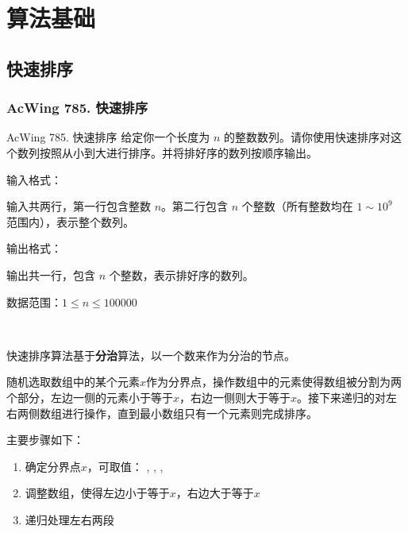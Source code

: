 \chapter{算法基础}


\section{快速排序}

\subsection{AcWing 785. 快速排序}

\begin{titledbox}{AcWing 785. 快速排序}
    给定你一个长度为 $n$ 的整数数列。请你使用快速排序对这个数列按照从小到大进行排序。并将排好序的数列按顺序输出。

    输入格式：

    输入共两行，第一行包含整数 $n$。第二行包含 $n$ 个整数（所有整数均在 $1 \sim 10^9$ 范围内），表示整个数列。

    输出格式：

    输出共一行，包含 $n$ 个整数，表示排好序的数列。

    数据范围：$1 \le n \le 100000$

    \begin{inputblock}
         \\
    \end{inputblock}
    \begin{outputblock}
    \end{outputblock}
\end{titledbox}

快速排序算法基于\textbf{分治}算法，以一个数来作为分治的节点。

随机选取数组中的某个元素$x$作为分界点，操作数组中的元素使得数组被分割为两个部分，左边一侧的元素小于等于$x$，右边一侧则大于等于$x$。接下来递归的对左右两侧数组进行操作，直到最小数组只有一个元素则完成排序。

主要步骤如下：
\begin{enumerate}
    \item 确定分界点$x$，可取值： ,  ,  , 
    \item 调整数组，使得左边小于等于$x$，右边大于等于$x$
    \item 递归处理左右两段
\end{enumerate}

